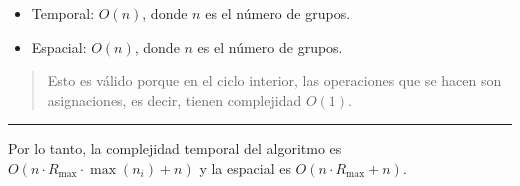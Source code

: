 \begin{itemize}
	\item Temporal: $O(n)$, donde $n$ es el número de grupos.
	\item Espacial: $O(n)$, donde $n$ es el número de grupos.
\end{itemize}

\begin{quote}
	Esto es válido porque en el ciclo interior, las operaciones que se hacen son asignaciones, es decir, tienen complejidad $O(1)$.
\end{quote}

\hrule

Por lo tanto, la complejidad temporal del algoritmo es $O(n \cdot R_{ \max } \cdot \max(n_i) + n)$ y la espacial es $O(n \cdot R_{ \max } + n)$.


